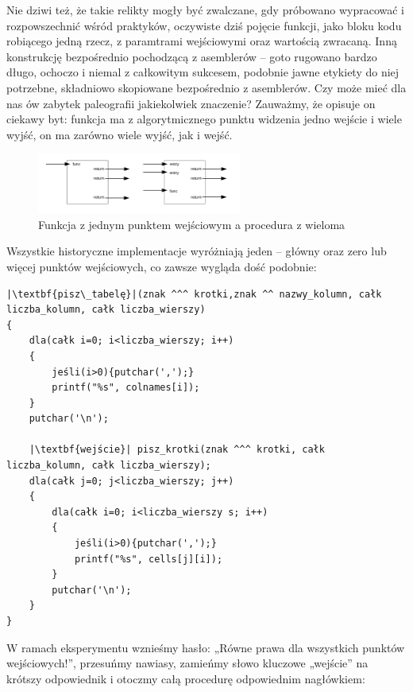 Nie dziwi też, że takie relikty mogły być zwalczane, gdy próbowano wypracować i rozpowszechnić wśród praktyków, oczywiste dziś pojęcie funkcji, jako bloku kodu robiącego jedną rzecz, z paramtrami wejściowymi oraz wartością zwracaną. Inną konstrukcję bezpośrednio pochodzącą z asemblerów – goto rugowano bardzo długo, ochoczo i niemal z całkowitym sukcesem, podobnie jawne etykiety do niej potrzebne, składniowo skopiowane bezpośrednio z asemblerów. Czy może mieć dla nas ów zabytek paleografii jakiekolwiek znaczenie? Zauważmy, że opisuje on ciekawy byt: funkcja ma z algorytmicznego punktu widzenia jedno wejście i wiele wyjść, on ma zarówno wiele wyjść, jak i wejść.
\begin{figure}[h]
    \centering
    \includegraphics[width=0.6\textwidth]{images/wywod/pudelka.png}
    \caption{Funkcja z jednym punktem wejściowym a procedura z wieloma}
\end{figure}

Wszystkie historyczne implementacje wyróżniają jeden – główny oraz zero lub więcej punktów wejściowych, co zawsze wygląda dość podobnie:


\lstset{
    escapechar=|,
    breaklines=true
}
\begin{lstlisting}
|\textbf{pisz\_tabelę}|(znak ^^^ krotki,znak ^^ nazwy_kolumn, całk liczba_kolumn, całk liczba_wierszy)
{
    dla(całk i=0; i<liczba_wierszy; i++)
    {
        jeśli(i>0){putchar(',');}
        printf("%s", colnames[i]);
    }
    putchar('\n');
    
    |\textbf{wejście}| pisz_krotki(znak ^^^ krotki, całk liczba_kolumn, całk liczba_wierszy);
    dla(całk j=0; j<liczba_wierszy; j++)
    {
        dla(całk i=0; i<liczba_wierszy s; i++)
        {
            jeśli(i>0){putchar(',');}
            printf("%s", cells[j][i]);
        }
        putchar('\n');
    }
}
\end{lstlisting}
W ramach eksperymentu wznieśmy hasło: „Równe prawa dla wszystkich punktów wejściowych!”, przesuńmy nawiasy,  zamieńmy słowo kluczowe „wejście” na krótszy odpowiednik i otoczmy całą procedurę odpowiednim nagłówkiem:

